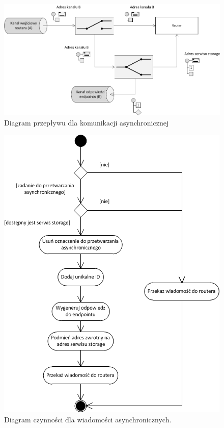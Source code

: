 
\begin{figure}[!h]
	\centering
	\includegraphics[scale=0.55]{asynchronous_detour.png}
	\caption{Diagram przepływu dla komunikacji asynchronicznej}\label{fig:asynchronous_detour}
\end{figure}

\begin{figure}[!h]
	\centering
	\includegraphics[scale=1.0]{asynchronous_activity_uml.png}
	\caption{Diagram czynności dla wiadomości asynchronicznych. }\label{fig:asynchronous_activity}
\end{figure}

